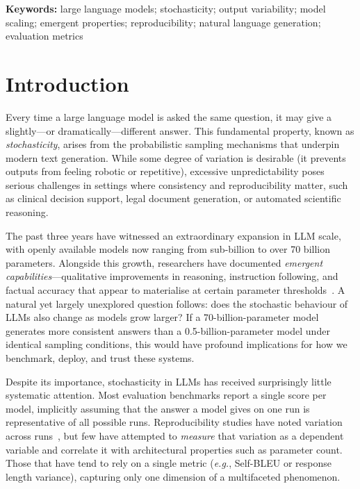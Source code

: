 \documentclass[11pt,a4paper]{article}
\newcommand{\eg}{\textit{e.g.}}
\begin{document}
\noindent\textbf{Keywords:} large language models; stochasticity; output variability; model scaling; emergent properties; reproducibility; natural language generation; evaluation metrics

\section{Introduction}
\label{sec:introduction}

Every time a large language model is asked the same question, it may give a slightly---or dramatically---different answer.
This fundamental property, known as \emph{stochasticity}, arises from the probabilistic sampling mechanisms that underpin modern text generation.
While some degree of variation is desirable (it prevents outputs from feeling robotic or repetitive), excessive unpredictability poses serious challenges in settings where consistency and reproducibility matter, such as clinical decision support, legal document generation, or automated scientific reasoning.

The past three years have witnessed an extraordinary expansion in LLM scale, with openly available models now ranging from sub-billion to over 70 billion parameters.
Alongside this growth, researchers have documented \emph{emergent capabilities}---qualitative improvements in reasoning, instruction following, and factual accuracy that appear to materialise at certain parameter thresholds~\citep{wei2022emergent,srivastava2022beyond}.
A natural yet largely unexplored question follows: does the stochastic behaviour of LLMs also change as models grow larger?
If a 70-billion-parameter model generates more consistent answers than a 0.5-billion-parameter model under identical sampling conditions, this would have profound implications for how we benchmark, deploy, and trust these systems.

Despite its importance, stochasticity in LLMs has received surprisingly little systematic attention.
Most evaluation benchmarks report a single score per model, implicitly assuming that the answer a model gives on one run is representative of all possible runs.
Reproducibility studies have noted variation across runs~\citep{zheng2023judging}, but few have attempted to \emph{measure} that variation as a dependent variable and correlate it with architectural properties such as parameter count.
Those that have tend to rely on a single metric (\eg, Self-BLEU or response length variance), capturing only one dimension of a multifaceted phenomenon.
\end{document}
